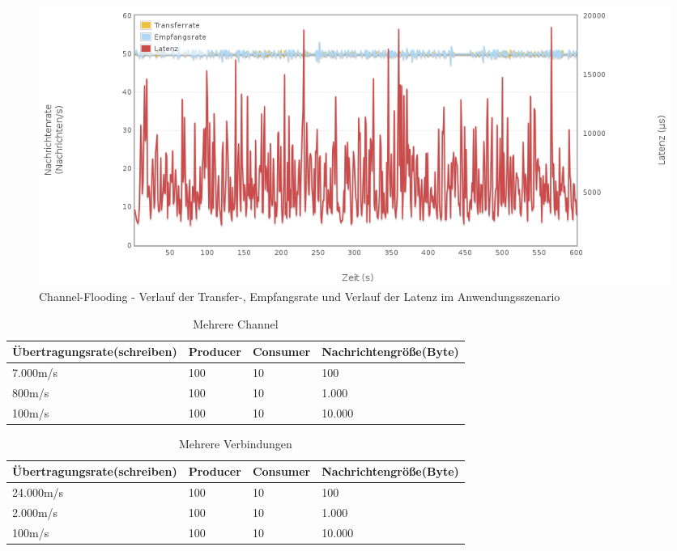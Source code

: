 \documentclass[	a4paper,
			11pt,
			oneside,
			parskip]{scrartcl}
\begin{document}
		\begin{figure}[!htb]
			\centering
			\includegraphics[width=\textwidth]{img/channel/channel_scenario.png}
			\caption{Channel-Flooding - Verlauf der Transfer-, Empfangsrate und Verlauf der Latenz im Anwendungsszenario}
			\label{fig:channel-scenario}
		\end{figure}
		
		\begin{table}[!htb]
			\centering
			\begin{tabular}{p{3cm}llp{3cm}}
				Übertragungsrate\newline (schreiben) & Producer & Consumer & Nachrichtengröße\newline (Byte) \\ \hline
				7.000m/s                             & 100      & 10       & 100                              \\
				800m/s                               & 100      & 10       & 1.000                            \\
				100m/s                               & 100      & 10       & 10.000
			\end{tabular}
			\caption{Mehrere Channel}
		\end{table}

		\begin{table}[!htb]
			\centering
			\begin{tabular}{p{3cm}llp{3cm}}
				Übertragungsrate\newline (schreiben) & Producer & Consumer & Nachrichtengröße\newline (Byte) \\ \hline
				24.000m/s                            & 100      & 10       & 100                             \\
				2.000m/s                             & 100      & 10       & 1.000                           \\
				100m/s                               & 100      & 10       & 10.000
			\end{tabular}
			\caption{Mehrere Verbindungen}
		\end{table}
	
\end{document}
